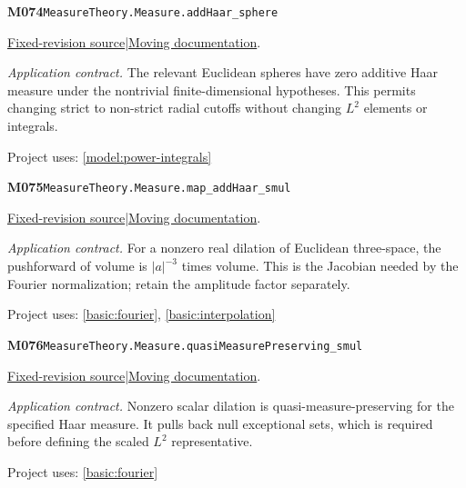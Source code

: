 \documentclass[11pt,a4paper]{article}
\theoremstyle{definition}
\theoremstyle{remark}
\begin{document}
\noindent\textbf{M074}\label{base:M074}\quad\nolinkurl{MeasureTheory.Measure.addHaar_sphere}

\href{https://github.com/leanprover-community/mathlib4/blob/9bac2d0692944a775113f7c130fd5e5b4608a854/Mathlib/MeasureTheory/Measure/Lebesgue/EqHaar.lean}{Fixed-revision source}\quad|\quad\href{https://leanprover-community.github.io/mathlib4_docs/Mathlib/MeasureTheory/Measure/Lebesgue/EqHaar.html#MeasureTheory.Measure.addHaar_sphere}{Moving documentation}.\par
\noindent\textit{Application contract.} The relevant Euclidean spheres have zero additive Haar measure under the nontrivial finite-dimensional hypotheses. This permits changing strict to non-strict radial cutoffs without changing $L^2$ elements or integrals.\par
{\small Project uses: \ref{model:power-integrals}}\par\medskip

\noindent\textbf{M075}\label{base:M075}\quad\nolinkurl{MeasureTheory.Measure.map_addHaar_smul}

\href{https://github.com/leanprover-community/mathlib4/blob/9bac2d0692944a775113f7c130fd5e5b4608a854/Mathlib/MeasureTheory/Measure/Lebesgue/EqHaar.lean}{Fixed-revision source}\quad|\quad\href{https://leanprover-community.github.io/mathlib4_docs/Mathlib/MeasureTheory/Measure/Lebesgue/EqHaar.html#MeasureTheory.Measure.map_addHaar_smul}{Moving documentation}.\par
\noindent\textit{Application contract.} For a nonzero real dilation of Euclidean three-space, the pushforward of volume is $|a|^{-3}$ times volume. This is the Jacobian needed by the Fourier normalization; retain the amplitude factor separately.\par
{\small Project uses: \ref{basic:fourier}, \ref{basic:interpolation}}\par\medskip

\noindent\textbf{M076}\label{base:M076}\quad\nolinkurl{MeasureTheory.Measure.quasiMeasurePreserving_smul}

\href{https://github.com/leanprover-community/mathlib4/blob/9bac2d0692944a775113f7c130fd5e5b4608a854/Mathlib/MeasureTheory/Measure/Lebesgue/EqHaar.lean}{Fixed-revision source}\quad|\quad\href{https://leanprover-community.github.io/mathlib4_docs/Mathlib/MeasureTheory/Measure/Lebesgue/EqHaar.html#MeasureTheory.Measure.quasiMeasurePreserving_smul}{Moving documentation}.\par
\noindent\textit{Application contract.} Nonzero scalar dilation is quasi-measure-preserving for the specified Haar measure. It pulls back null exceptional sets, which is required before defining the scaled $L^2$ representative.\par
{\small Project uses: \ref{basic:fourier}}\par\medskip
\end{document}
